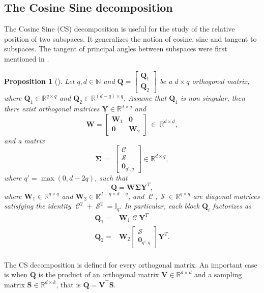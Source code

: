 \documentclass[twoside,11pt]{book}
\newtheorem{proposition}{Proposition}
\numberwithin{theorem}{chapter}
\numberwithin{definition}{chapter}
\numberwithin{proposition}{chapter}
\numberwithin{corollary}{chapter}
\numberwithin{example}{chapter}
\numberwithin{lemma}{chapter}
\numberwithin{assumption}{chapter}
\DeclareMathOperator{\Tran}{\intercal}
\DeclareMathOperator{\Sinmatrix}{\mathcal{S}}
\DeclareMathOperator{\Cosmatrix}{\mathcal{C}}
\begin{document}
\subsection{The Cosine Sine decomposition}
The Cosine Sine (CS) decomposition is useful for the study of the relative position of two subspaces. It generalizes the notion of cosine, sine and tangent to subspaces. The tangent of principal angles between subspaces were first mentioned in \citealp{ZhKn13}.
\begin{proposition}[\citealp{GoVa96}]
Let $q,d \in \mathbb{N}$ and $\bm{Q} =
\left[
\begin{array}{c}
\bm{Q}_{1}  \\
\hline
\bm{Q}_{2}
\end{array}
\right]
$ be a $d\times q$ orthogonal matrix, where $\bm{Q}_{1} \in \mathbb{R}^{q \times q}$ and $\bm{Q}_{2} \in \mathbb{R}^{(d-q)\times q}$. Assume that $\bm{Q}_{1}$ is non singular, then there exist orthogonal matrices $\bm{Y}\in\mathbb{R}^{d \times q}$ and
\begin{equation}
 \bm{W} =
\left[
\begin{array}{c|c}
\bm{W}_{1} & \bm{0} \\
\hline
\bm{0} & \bm{W}_{2}
\end{array}
\right]~\in~\mathbb{R}^{d \times d},
\end{equation}
and a matrix
\begin{equation}
\bm{\Sigma}~=~\left[
\begin{array}{c}
\Cosmatrix \\
\hline
\Sinmatrix \\
\hline
\bm{0}_{q',q}
\end{array}
\right] \in \mathbb{R}^{d \times q},
\end{equation}
where $q' = \max(0,d-2q)$, such that
\begin{equation}
    \bm{Q} = \bm{W}\bm{\Sigma}\bm{Y}^{T},
\end{equation}
where $\bm{W}_{1} \in \mathbb{R}^{q \times q}$ and $\bm{W}_{2} \in \mathbb{R}^{d-q \times d-q}$, and $\Cosmatrix, \Sinmatrix \in \mathbb{R}^{q\times q}$ are diagonal matrices satisfying the identity $\Cosmatrix^{2} + \Sinmatrix^{2} = \mathbb{I}_{q}$.
In particular, each block $\bm{Q}_{i}$ factorizes as
\begin{equation}
\begin{split}
    \bm{Q}_{1} = & \bm{W}_{1}\Cosmatrix\bm{Y}^{T} \\
    \bm{Q}_{2} = & \bm{W}_{2}\left[
\begin{array}{c}
\Sinmatrix \\
\hline
\bm{0}_{q',q}
\end{array}
\right]\bm{Y}^{T} .\\
\end{split}
\end{equation}

\label{CSD_proposition}
\end{proposition}
The CS decomposition is defined for every orthogonal matrix. An important case is when $\bm{Q}$ is the product of an orthogonal matrix $\bm{V} \in \mathbb{R}^{d \times d}$ and a sampling matrix $\bm{S} \in \mathbb{R}^{d \times k}$, that is $\bm{Q} = \bm{V}^{\Tran}\bm{S}$.
\end{document}
